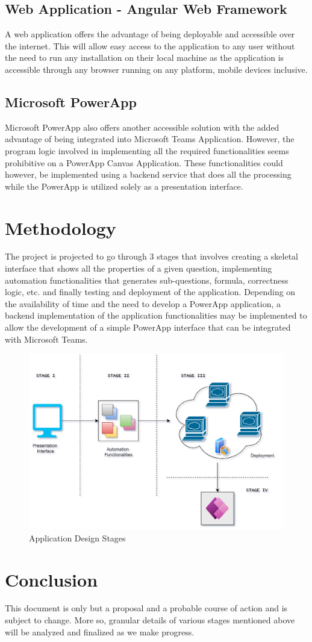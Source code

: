 \documentclass[a4paper, 12pt]{article}
\begin{document}
\subsection{Web Application - Angular Web Framework}

A web application offers the advantage of being deployable and accessible over the internet. This will allow easy access to the application to any user without
the need to run any installation on their local machine as the application is accessible through any browser running on any platform, mobile devices inclusive. 


\subsection{Microsoft PowerApp}

Microsoft PowerApp also offers another accessible solution with the added advantage of being integrated into Microsoft Teams Application. However, the program 
logic involved in implementing all the required functionalities seems prohibitive on a PowerApp Canvas Application. 
These functionalities could however, be implemented using a backend service that does all the processing while the PowerApp is utilized solely as a 
presentation interface. 


\section{Methodology}

The project is projected to go through 3 stages that involves creating a skeletal interface that shows all the properties of a given question, 
implementing automation functionalities that generates sub-questions, formula, correctness logic, etc. and finally testing and deployment of the 
application. 
Depending on the availability of time and the need to develop a PowerApp application, a backend implementation of the application functionalities may be 
implemented to allow the development of a simple PowerApp interface that can be integrated with Microsoft Teams.

\begin{figure}[h]
    \begin{center}
       \includegraphics[width=12cm]{images/app_meth.png} 
       \caption[]{Application Design Stages}\label{fig:app_meth}
    \end{center}
\end{figure}
\section{Conclusion}
This document is only but a proposal and a probable course of action and is subject to change. More so, granular details of various stages mentioned
above will be analyzed and finalized as we make progress.
\end{document}
